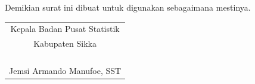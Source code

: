 \documentclass{article}
\begin{document}
Demikian surat ini dibuat untuk digunakan sebagaimana mestinya.

\bigskip
\hfill
\begin{tabular}{@{}c}
Kepala Badan Pusat Statistik\\
Kabupaten Sikka \bigskip\\
\\
\\
\\
\\
Jemsi Armando Manufoe, SST
\end{tabular}
\end{document}
